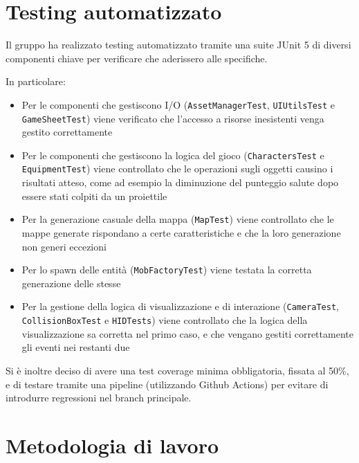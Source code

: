 \documentclass[a4paper,12pt]{report}
\begin{document}
    \section{Testing automatizzato}
    \par Il gruppo ha realizzato testing automatizzato tramite una suite JUnit 5 di diversi componenti chiave
        per verificare che aderissero alle specifiche.
    \par In particolare:
        \begin{itemize}
            \item Per le componenti che gestiscono I/O (\texttt{AssetManagerTest}, \texttt{UIUtilsTest} e \texttt{GameSheetTest}) viene verificato che l'accesso a risorse inesistenti venga gestito correttamente
            \item Per le componenti che gestiscono la logica del gioco (\texttt{CharactersTest} e \texttt{EquipmentTest}) viene controllato che le operazioni sugli oggetti causino i risultati atteso, come ad esempio la diminuzione del punteggio salute dopo essere stati colpiti da un proiettile
            \item Per la generazione casuale della mappa (\texttt{MapTest}) viene controllato che le mappe generate rispondano a certe caratteristiche e che la loro generazione non generi eccezioni
            \item Per lo spawn delle entità (\texttt{MobFactoryTest}) viene testata la corretta generazione delle stesse
            \item Per la gestione della logica di visualizzazione e di interazione (\texttt{CameraTest}, \texttt{CollisionBoxTest} e \texttt{HIDTests}) viene controllato che la logica della visualizzazione sa corretta nel primo caso, e che vengano gestiti correttamente gli eventi nei restanti due
        \end{itemize}
    \par Si è inoltre deciso di avere una test coverage minima obbligatoria, fissata al 50\%, e di testare tramite una pipeline (utilizzando Github Actions) per evitare di introdurre regressioni nel branch principale.
    \section{Metodologia di lavoro}
\end{document}
